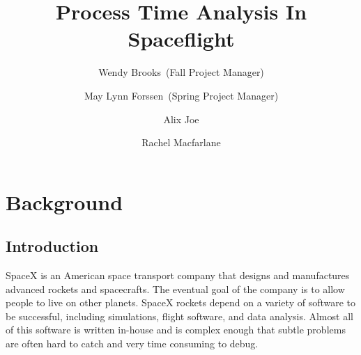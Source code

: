 \documentclass{hmcclinic}
\title{Process Time Analysis In Spaceflight}
\author{Wendy Brooks~(Fall Project Manager) \and May Lynn Forssen~(Spring Project Manager) \and Alix Joe \and
Rachel Macfarlane}
\begin{document}

\maketitle




\chapter{Background} %
\section{Introduction}
SpaceX is an American space transport company that designs and manufactures
advanced rockets and spacecrafts. The eventual goal of the company is to allow
people to live on other planets. SpaceX rockets depend on a variety of software
to be successful, including simulations, flight software, and data analysis.
Almost all of this software is written in-house and is complex enough that subtle
problems are often hard to catch and very time consuming to debug.

\end{document}
